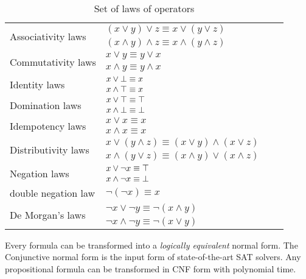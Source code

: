 \begin{table}[!htbp]
 \centering
 \scriptsize
 \begin{tabular}{lllc}
  \multirow{2}{*}{Associativity laws} & $(x \lor y) \lor z \equiv x \lor (y \lor z)$\\
          & $(x \land y) \land z \equiv x \land (y \land z)$\\
  \hline              
  \multirow{2}{*}{Commutativity laws} & $x \lor y \equiv y \lor x$\\
          & $x \land y \equiv y \land x$\\
  \hline      
  \multirow{2}{*}{Identity laws} & $x \lor \bot \equiv x$\\
           & $x \land \top \equiv x$\\
  \hline        
  \multirow{2}{*}{Domination laws} & $x \lor \top \equiv \top$\\
           &  $x \land \bot \equiv \bot$\\
  \hline        
  \multirow{2}{*}{Idempotency laws} & $x \lor x \equiv x$\\
               & $x \land x \equiv x$\\     
  \hline        
  \multirow{2}{*}{Distributivity laws} & $x \lor (y \land z) \equiv (x \lor y) \land (x \lor z)$\\
           & $x \land (y \lor z) \equiv (x \land y) \lor (x \land z)$\\
 \hline        
 \multirow{2}{*}{Negation laws}  & $x \lor \neg x \equiv \top$\\
        & $x \land \neg x \equiv \bot$\\
  \hline
   double negation law & $\neg (\neg x) \equiv x$ \\
  \hline
  \multirow{2}{*}{De Morgan’s laws} & $\neg x \lor \neg y \equiv \neg (x \land y)$\\
            &  $\neg x \land \neg y \equiv \neg (x \lor y)$\\
 \end{tabular}
 \caption{Set of laws of operators}
 \label{tab:laws}
\end{table}
Every formula can be transformed into a \textit{logically equivalent} normal form.
The Conjunctive normal form is the input form of state-of-the-art SAT solvers. Any propositional
formula can be transformed in CNF form with polynomial time\cite{Russell1994ArtiCI}. 


